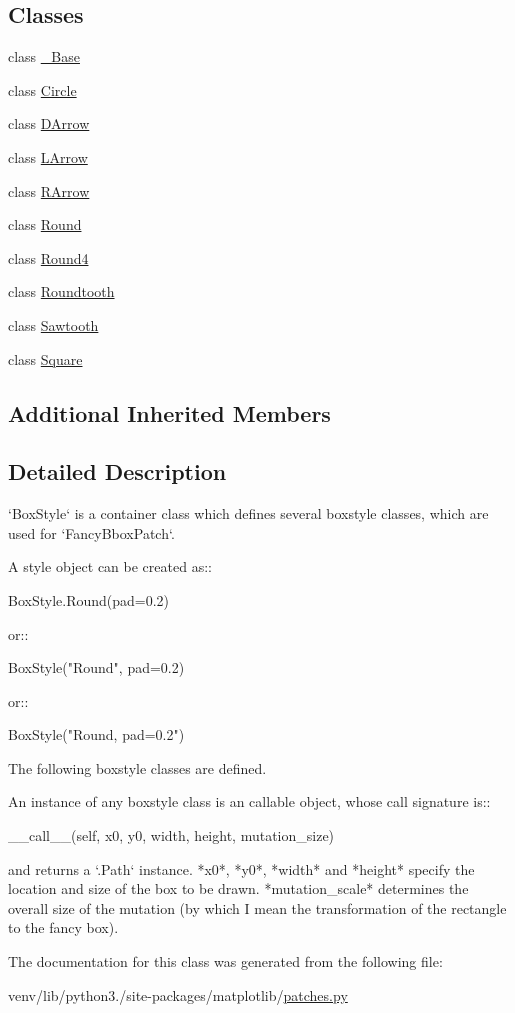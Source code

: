 \subsection*{Classes}
\begin{DoxyCompactItemize}
\item 
class \hyperlink{classmatplotlib_1_1patches_1_1BoxStyle_1_1__Base}{\+\_\+\+Base}
\item 
class \hyperlink{classmatplotlib_1_1patches_1_1BoxStyle_1_1Circle}{Circle}
\item 
class \hyperlink{classmatplotlib_1_1patches_1_1BoxStyle_1_1DArrow}{D\+Arrow}
\item 
class \hyperlink{classmatplotlib_1_1patches_1_1BoxStyle_1_1LArrow}{L\+Arrow}
\item 
class \hyperlink{classmatplotlib_1_1patches_1_1BoxStyle_1_1RArrow}{R\+Arrow}
\item 
class \hyperlink{classmatplotlib_1_1patches_1_1BoxStyle_1_1Round}{Round}
\item 
class \hyperlink{classmatplotlib_1_1patches_1_1BoxStyle_1_1Round4}{Round4}
\item 
class \hyperlink{classmatplotlib_1_1patches_1_1BoxStyle_1_1Roundtooth}{Roundtooth}
\item 
class \hyperlink{classmatplotlib_1_1patches_1_1BoxStyle_1_1Sawtooth}{Sawtooth}
\item 
class \hyperlink{classmatplotlib_1_1patches_1_1BoxStyle_1_1Square}{Square}
\end{DoxyCompactItemize}
\subsection*{Additional Inherited Members}


\subsection{Detailed Description}
\begin{DoxyVerb}`BoxStyle` is a container class which defines several
boxstyle classes, which are used for `FancyBboxPatch`.

A style object can be created as::

       BoxStyle.Round(pad=0.2)

or::

       BoxStyle("Round", pad=0.2)

or::

       BoxStyle("Round, pad=0.2")

The following boxstyle classes are defined.


An instance of any boxstyle class is an callable object,
whose call signature is::

   __call__(self, x0, y0, width, height, mutation_size)

and returns a `.Path` instance. *x0*, *y0*, *width* and
*height* specify the location and size of the box to be
drawn. *mutation_scale* determines the overall size of the
mutation (by which I mean the transformation of the rectangle to
the fancy box).
\end{DoxyVerb}
 

The documentation for this class was generated from the following file\+:\begin{DoxyCompactItemize}
\item 
venv/lib/python3./site-\/packages/matplotlib/\hyperlink{patches_8py}{patches.\+py}\end{DoxyCompactItemize}
